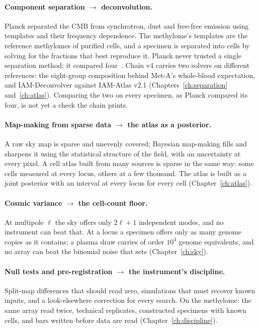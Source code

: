 \paragraph{Component separation $\to$ deconvolution.} Planck separated the CMB from synchrotron, dust and free-free emission
using templates and their frequency dependence. The methylome's templates are the reference methylomes of purified cells,
and a specimen is separated into cells by solving for the fractions that best reproduce it. Planck never trusted a single
separation method; it compared four~\cite{Planck2018IV}. Chain v4 carries two solvers on different references: the eight-group composition behind Met-A's whole-blood expectation, and IAM-Deconvolver against IAM-Atlas v2.1 (Chapters~\ref{ch:separation} and~\ref{ch:atlas}). Comparing the two on every specimen, as Planck compared its four, is not yet a check the chain prints. \openprob

\paragraph{Map-making from sparse data $\to$ the atlas as a posterior.} A raw sky map is sparse and unevenly covered;
Bayesian map-making fills and sharpens it using the statistical structure of the field, with an uncertainty at every pixel.
A cell atlas built from many sources is sparse in the same way: some cells measured at every locus, others at a few thousand.
The atlas is built as a joint posterior with an interval at every locus for every cell (Chapter~\ref{ch:atlas}).

\paragraph{Cosmic variance $\to$ the cell-count floor.} At multipole $\ell$ the sky offers only $2\ell+1$ independent modes, and
no instrument can beat that. At a locus a specimen offers only as many genome copies as it contains; a plasma draw carries of
order $10^4$ genome equivalents, and no array can beat the binomial noise that sets (Chapter~\ref{ch:sky}). \derived

\paragraph{Null tests and pre-registration $\to$ the instrument's discipline.} Split-map differences that should read zero,
simulations that must recover known inputs, and a look-elsewhere correction for every search. On the methylome: the same array
read twice, technical replicates, constructed specimens with known cells, and bars written before data are read
(Chapter~\ref{ch:discipline}).

